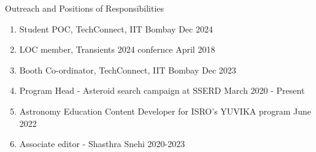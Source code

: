 \begin{rSection}{Outreach and Positions of Responsibilities} 
\begin{enumerate}[itemsep=-0.5em, leftmargin=-0.8em, rightmargin=0.3em]
    \item [] Student POC,  TechConnect, IIT Bombay \hfill Dec 2024
    \item [] LOC member, Transients 2024 confernce \hfill April 2018
    \item [] Booth Co-ordinator, TechConnect, IIT Bombay \hfill Dec 2023
    \item [] Program Head - Asteroid search campaign at SSERD \hfill March 2020 - Present
    \item [] Astronomy Education Content Developer for ISRO’s YUVIKA program \hfill June 2022
    \item [] Associate editor - Shasthra Snehi \hfill 2020-2023
\end{enumerate}
\end{rSection}